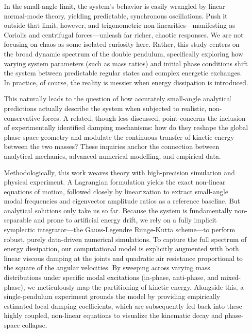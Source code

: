 \documentclass[12pt, a4paper, twoside]{article}
\begin{document}
In the small-angle limit, the system’s behavior is easily wrangled by linear normal-mode theory, yielding predictable, synchronous oscillations. Push it outside that limit, however, and trigonometric non-linearities—manifesting as Coriolis and centrifugal forces—unleash far richer, chaotic responses. We are not focusing on chaos as some isolated curiosity here. Rather, this study centers on the broad dynamic spectrum of the double pendulum, specifically exploring how varying system parameters (such as mass ratios) and initial phase conditions shift the system between predictable regular states and complex energetic exchanges. In practice, of course, the reality is messier when energy dissipation is introduced.

This naturally leads to the question of how accurately small-angle analytical predictions actually describe the system when subjected to realistic, non-conservative forces. A related, though less discussed, point concerns the inclusion of experimentally identified damping mechanisms: how do they reshape the global phase-space geometry and modulate the continuous transfer of kinetic energy between the two masses? These inquiries anchor the connection between analytical mechanics, advanced numerical modelling, and empirical data.

Methodologically, this work weaves theory with high-precision simulation and physical experiment. A Lagrangian formulation yields the exact non-linear equations of motion, followed closely by linearization to extract small-angle modal frequencies and eigenvector amplitude ratios as a reference baseline. But analytical solutions only take us so far. Because the system is fundamentally non-separable and prone to artificial energy drift, we rely on a fully implicit symplectic integrator—the Gauss-Legendre Runge-Kutta scheme—to perform robust, purely data-driven numerical simulations. To capture the full spectrum of energy dissipation, our computational model is explicitly augmented with both linear viscous damping at the joints and quadratic air resistance proportional to the square of the angular velocities. By sweeping across varying mass distributions under specific modal excitations (in-phase, anti-phase, and mixed-phase), we meticulously map the partitioning of kinetic energy. Alongside this, a single-pendulum experiment grounds the model by providing empirically estimated local damping coefficients, which are subsequently fed back into these highly coupled, non-linear equations to visualize the kinematic decay and phase-space collapse.
\end{document}
